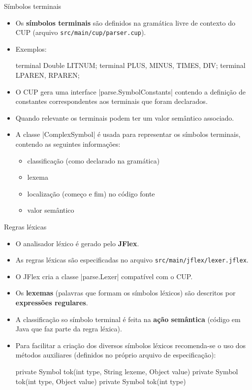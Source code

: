 \documentclass[smaller]{beamer}
\begin{document}
\begin{frame}{Símbolos terminais}
  \begin{itemize}
    \item Os \textbf{símbolos terminais} são definidos na gramática
    livre de contexto do CUP (arquivo
    \texttt{src/main/cup/parser.cup}).
    \item Exemplos:
\begin{pygmented}[]
terminal Double LITNUM;
terminal        PLUS, MINUS, TIMES, DIV;
terminal        LPAREN, RPAREN;
\end{pygmented}
    
    \item O CUP gera uma interface \pyginline|parse.SymbolConstants|
    contendo a definição de constantes correspondentes aos terminais
    que foram declarados.
    
    \item Quando relevante os terminais podem ter um valor semântico
    associado.

    \item A classe \pyginline|ComplexSymbol| é usada para representar
    os símbolos terminais, contendo as seguintes informações:
    \begin{itemize}
      \item classificação (como declarado na gramática)
      \item lexema
      \item localização (começo e fim) no código fonte
      \item valor semântico
    \end{itemize}
  \end{itemize}
\end{frame}

\begin{frame}{Regras léxicas}
  \begin{itemize}
    \item O analisador léxico é gerado pelo \textbf{JFlex}.
    \item As regras léxicas são especificadas no arquivo
    \alert{\texttt{src/main/jflex/lexer.jflex}}.
    \item O JFlex cria a classe \pyginline|parse.Lexer| compatível com
    o CUP.
    \item Os \textbf{lexemas} (palavras que formam os símbolos
    léxicos) são descritos por \textbf{expressões regulares}.
    \item A classificação so símbolo terminal é feita na \textbf{ação
      semântica} (código em Java que faz parte da regra léxica).
    \item Para facilitar a criação dos diversos símbolos léxicos
    recomenda-se o uso dos \alert{métodos auxiliares} (definidos no
    próprio arquivo de especificação):
\begin{pygmented}[]
private Symbol tok(int type, String lexeme, Object value)
private Symbol tok(int type, Object value)
private Symbol tok(int type)
\end{pygmented}
  \end{itemize}
\end{frame}
\end{document}
